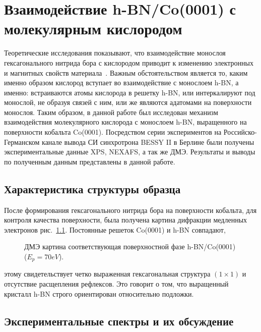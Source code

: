 \chapter{Взаимодействие h-BN/Co(0001) с молекулярным кислородом} \label{chapt3}

Теоретические исследования показывают, что взаимодействие монослоя гексагонального 
нитрида бора с кислородом приводит к изменению электронных и магнитных
свойств материала~\cite{Ataca2010,Zhou2010}. Важным обстоятельством является то, каким именно образом кислород
вступает во взаимодействие с монослоем h-BN, а именно: встраиваются атомы кислорода в решетку 
h-BN, или интеркалируют под монослой, не образуя связей с ним, или же являются 
адатомами на поверхности монослоя. Таким образом, в данной работе был 
исследован механизм взаимодействия молекулярного кислорода с монослоем h-BN, выращенного на 
поверхности кобальта Co(0001). Посредством серии экспериментов на Российско-Германском
канале вывода СИ синхротрона BESSY II в Берлине были получены экспериментальные 
данные XPS, NEXAFS, а так же ДМЭ. Результаты и выводы по полученным данным 
представлены в данной работе.

\section{Характеристика структуры образца}

После формирования гексагонального нитрида бора на поверхности кобальта, для контроля
качества  поверхности, была получена картина дифракции медленных электронов
рис.~\ref{pic:LEED}. Постоянные решеток Co(0001) и h-BN совпадают, 
	\begin{figure}[!ht]
		\caption{ДМЭ картина соответствующая поверхностной фазе h-BN/Co(0001)($E_p = 70 eV$).}
		\label{pic:LEED}
	\end{figure}
этому свидетельствует четко выраженная гексагональная структура $(1\times1)$ 
и отсутствие расщепления рефлексов.
Это говорит о том, что выращенный кристалл h-BN строго
ориентирован относительно подложки.



\section{Экспериментальные спектры и их обсуждение}

